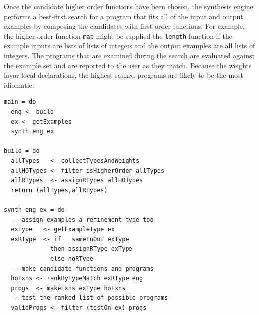 Once the candidate higher order functions have been chosen, the synthesis engine performs a best-first search for a program that fits all of the input and output examples by composing the candidates with first-order functions. For example, the higher-order function \texttt{map} might be supplied the \texttt{length} function if the example inputs are lists of lists of integers and the output examples are all lists of integers. The programs that are examined during the search are evaluated against the example set and are reported to the user as they match. Because the weights favor local declarations, the highest-ranked programs are likely to be the most idiomatic.


\begin{lstlisting}[caption=A pseudocode representation of the build and synthesis stages of the synthesis algorithm. We will explain each line of this in the proceeding sections., label=psuedoAlgo]
main = do
  eng <- build
  ex <- getExamples
  synth eng ex
  
build = do
  allTypes   <- collectTypesAndWeights
  allHOTypes <- filter isHigherOrder allTypes
  allRTypes  <- assignRTypes allHOTypes
  return (allTypes,allRTypes)
  
synth eng ex = do
  -- assign examples a refinement type too
  exType   <- getExampleType ex
  exRType  <- if   sameInOut exType
             then assignRType exType
             else noRType
  -- make candidate functions and programs
  hoFxns <- rankByTypeMatch exRType eng
  progs  <- makeFxns exType hoFxns
  -- test the ranked list of possible programs
  validProgs <- filter (testOn ex) progs
\end{lstlisting}
